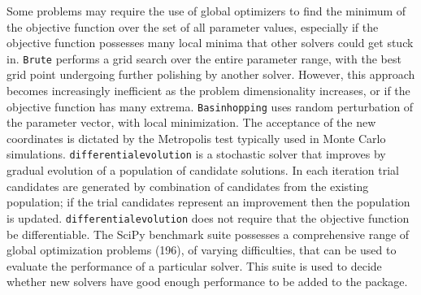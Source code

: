 Some problems may require the use of global optimizers to find the minimum of the objective function over the set of all parameter values, especially if the objective function possesses many local minima that other solvers could get stuck in.
\texttt{Brute} performs a grid search over the entire parameter range, with the best grid point undergoing further polishing by another solver. However, this approach becomes increasingly inefficient as the problem dimensionality increases, or if the objective function has many extrema.
\texttt{Basinhopping} \cite{Wales1997} uses random perturbation of the parameter vector, with local minimization. The acceptance of the new coordinates is dictated by the Metropolis test typically used in Monte Carlo simulations.
\texttt{differential\textunderscore evolution} \cite{Wormington1999,Storn1997} is a stochastic solver that improves by gradual evolution of a population of candidate solutions. In each iteration trial candidates are generated by combination of candidates from the existing population; if the trial candidates represent an improvement then the population is updated. \texttt{differential\textunderscore evolution} does not require that the objective function be differentiable.
The SciPy benchmark suite possesses a comprehensive range of global optimization problems (196), of varying difficulties, that can be used to evaluate the performance of a particular solver. This suite is used to decide whether new solvers have good enough performance to be added to the package.